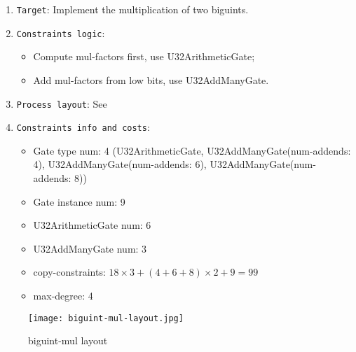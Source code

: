 
\begin{enumerate}
    \item \verb|Target|: Implement the multiplication of two biguints.
    \item \verb|Constraints logic|:
    \begin{itemize}
        \item Compute mul-factors first, use U32ArithmeticGate;
        \item Add mul-factors from low bits, use U32AddManyGate.
    \end{itemize}
    \item \verb|Process layout|: See 
    \item \verb|Constraints info and costs|:
    \begin{itemize}
        \item Gate type num: 4 (U32ArithmeticGate, U32AddManyGate(num-addends: 4), U32AddManyGate(num-addends: 6), U32AddManyGate(num-addends: 8))
        \item Gate instance num: 9
        \item U32ArithmeticGate num: 6
        \item U32AddManyGate num: 3
        \item copy-constraints: $18 \times 3 + (4 + 6 + 8) \times 2 + 9 = 99$
        \item max-degree: 4
    \end{itemize}
\end{enumerate}

\begin{figure}[!ht]
    \centering
    \texttt{[image: biguint-mul-layout.jpg]}
    \caption{biguint-mul layout}
    \label{fig:biguint-mul-layout}
\end{figure}

